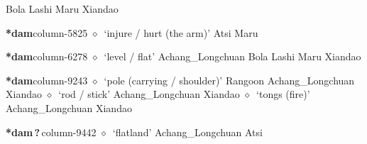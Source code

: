          Bola 
\hspace{1ex}
         Lashi 
\hspace{1ex}
         Maru 
\hspace{1ex}
         Xiandao 
  \item {\footnotesize \textbf{*dam}}{\tiny column-5825}
         $\diamond$~`injure / hurt (the arm)'
         Atsi 
\hspace{1ex}
         Maru 
  \item {\footnotesize \textbf{*dam}}{\tiny column-6278}
         $\diamond$~`level / flat'
         Achang\_Longchuan 
\hspace{1ex}
         Bola 
\hspace{1ex}
         Lashi 
\hspace{1ex}
         Maru 
\hspace{1ex}
         Xiandao 
  \item {\footnotesize \textbf{*dam}}{\tiny column-9243}
         $\diamond$~`pole (carrying / shoulder)'
         Rangoon 
\hspace{1ex}
         Achang\_Longchuan 
\hspace{1ex}
         Xiandao 
\hspace{1ex}
         $\diamond$~`rod / stick'
         Achang\_Longchuan 
\hspace{1ex}
         Xiandao 
\hspace{1ex}
         $\diamond$~`tongs (fire)'
         Achang\_Longchuan 
\hspace{1ex}
         Xiandao 
  \item {\footnotesize \textbf{*dam\,?\,}}{\tiny column-9442}
         $\diamond$~`flatland'
         Achang\_Longchuan 
\hspace{1ex}
         Atsi 
